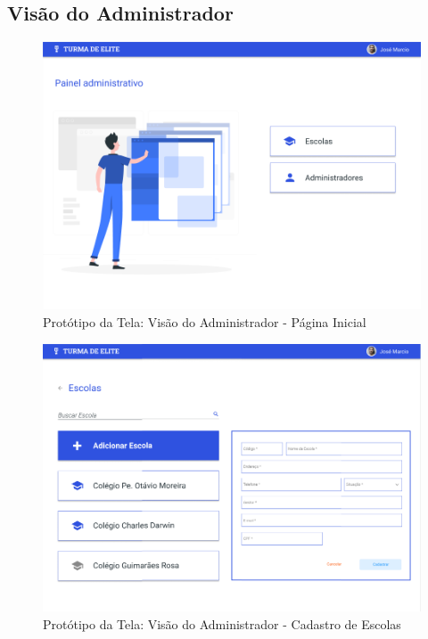 \begin{apendicesenv}
\section{Visão do Administrador}

\begin{figure}[htb]
    \centering
	\includegraphics[width=16cm]{imagens/Administrador-PaginaInicial.png}
	\caption{\label{fig:administrador} Protótipo da Tela: Visão do Administrador - Página Inicial}
\end{figure}
\FloatBarrier

\begin{figure}[htb]
    \centering
	\includegraphics[width=16cm]{imagens/Administrador-CadastroEscola.png}
	\caption{\label{fig:cadastro-escola} Protótipo da Tela: Visão do Administrador - Cadastro de Escolas}
\end{figure}
\FloatBarrier


\end{apendicesenv}
